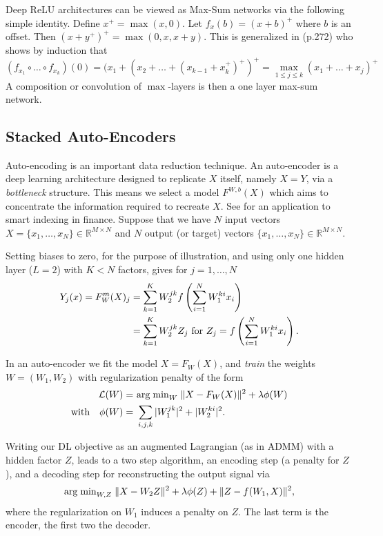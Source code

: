 \documentclass[12pt]{article}
\begin{document}
\vspace{1em}
Deep ReLU architectures can be viewed as Max-Sum networks via the following simple identity. 
Define $ x^+ = \max(x,0) $. Let $ f_x ( b ) = ( x + b )^+ $ where $b$ is an offset. Then $ ( x + y^+ )^+ = \max ( 0 , x , x+y ) $. This is generalized
in \cite{feller_introduction_1971} (p.272) who shows by induction that 
$$
( f_{x_1} \circ \ldots \circ f_{x_k} ) (0) = ( x_1 + ( x_2 + \ldots + ( x_{k-1} + x_k^+ )^+ )^+
= \max_{1 \leq j \leq k} ( x_1 + \ldots + x_j )^+ 
$$
A composition or convolution of $ \max $-layers is then a one layer max-sum network.

\subsection{Stacked Auto-Encoders}

Auto-encoding is an important data reduction technique.
An auto-encoder is a deep learning architecture designed to replicate $X$ itself, namely $X=Y$, via a \emph{bottleneck} structure.
This means we select a model $F^{W,b} (X) $ which aims to concentrate the information required to recreate $X$. See \cite{heaton2017deep} for an application to smart indexing in finance.
Suppose that we have $ N $ input vectors $ X = \{ x_1 , \ldots , x_N \} \in \mathbb{R}^{M\times N} $ and
$ N $ output (or target) vectors $ \{ x_1 , \ldots , x_N \} \in \mathbb{R}^{M\times N}$. 


Setting biases to zero, for the purpose of illustration, and using only one hidden layer ($L=2$) with $K < N $ factors, gives for $j=1, \ldots, N$
\begin{align*}
Y_j(x) = F^m_{W} ( X )_j & = \sum_{k=1}^K W^{jk}_2 f \left ( \sum_{i=1}^N W^{ki}_1 x_i \right )\\
& =  \sum_{k=1}^K W^{jk}_2 Z_j \,\, {\rm for }\,\, Z_j =  f \left ( \sum_{i=1}^N W^{ki}_1 x_i \right ).
\end{align*}

In an auto-encoder we fit the model $X = F_{W}( X) $, and \emph{train} the weights $ W = ( W_1 , W_2 ) $ with regularization penalty of the form
\begin{align*}
\mathcal{L} ( W )  =&\  {\rm arg \; min}_W \; \Vert X - F_W (X) \Vert^2  + \lambda \phi(W) \\
\text{with}\quad \phi(W) =&\  \sum_{i,j,k} | W^{jk}_1 |^2 +  | W^{ki}_2 |^2.
\end{align*}

Writing our DL objective as an augmented Lagrangian (as in ADMM) with a hidden factor $Z$, leads to a two step algorithm, an encoding step (a penalty for $Z$), and a decoding step for reconstructing the output signal via
$$
{\rm arg \; min}_{W,Z} \; \Vert X - W_2 Z \Vert^2 + \lambda \phi(Z) + \Vert Z -  f( W_1, X ) \Vert^2,
$$
where the regularization on $W_1$ induces a penalty on $Z$. The last term is the encoder, the first two the decoder.
\end{document}
